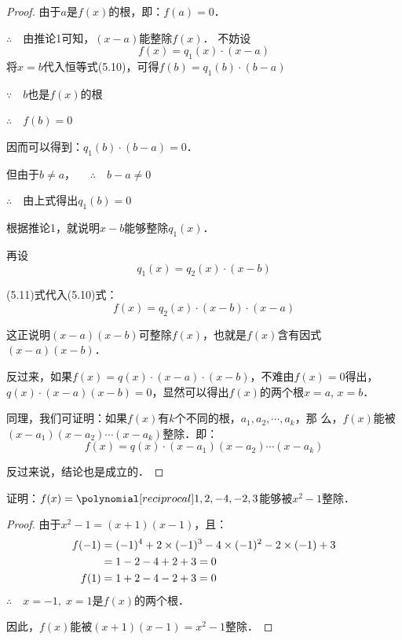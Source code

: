 \begin{proof}
    由于$a$是$f(x)$的根，即：$f(a)=0$．
   
    $\therefore\quad $由推论1可知，$(x-a)$能整除$f(x)$．
    不妨设
    \begin{equation}
        f(x)=q_1(x)\cdot (x-a)
    \end{equation}
    将$x=b$代入恒等式(5.10)，可得$f (b) =q_1 (b)\cdot (b-a)$

    $\because\quad b$也是$f(x)$的根
    
    $\therefore\quad f(b)=0$
    
    因而可以得到：$q_1(b)\cdot (b-a)=0$．
    
    但由于$b\ne a$，
    $\quad\therefore\quad b-a\ne 0$

    $\therefore\quad$由上式得出$q_1(b)=0$

    根据推论1，就说明$x-b$能够整除$q_1(x)$．
    
    再设
\begin{equation}
    q_1 (x) =q_2 (x) \cdot  (x-b)
\end{equation}
    
(5.11)式代入(5.10)式：
\[f (x) =q_2 (x) \cdot (x-b)\cdot (x-a)\]

这正说明$(x-a)(x-b)$可整除$f(x)$，也就是$f(x)$含有因式$(x-a)(x-b)$．

反过来，如果$f(x)=q(x)\cdot (x-a)·(x-b)$，不难由$f(x)=0$得出，$q(x)\cdot (x-a)(x-b)=0$，显然可以得出$f(x)$的两个根$x=a$, $x=b$．
    
    同理，我们可证明：如果$f(x)$有$k$个不同的根，$a_1,a_2,\cdots,a_k$，那
    么，$f(x)$能被$(x-a_1)(x-a_2)\cdots(x-a_k)$整除．即：
    \[f (x) =q (x) \cdot  (x-a_1) (x-a_2)\cdots (x-a_k)\] 
    
    反过来说，结论也是成立的．

\end{proof}

\begin{example}
证明：$f(x)=\poly{1,2,-4,-2,3}$能够被$x^2-1$整除．
\end{example}

\begin{proof}
由于$x^2-1=(x+1)(x-1)$，且：
\[\begin{split}
    f(-1)&=(-1)^4+2\times(-1)^3-4\times(-1)^2-2\times (-1)+3\\
&=1-2-4+2+3=0\\
f(1)&=1+2-4-2+3=0
\end{split}\]
$\therefore\quad x=-1,\; x=1$是$f(x)$的两个根．

因此，$f(x)$能被$(x+1)(x-1)=x^2-1$整除．

\end{proof}

